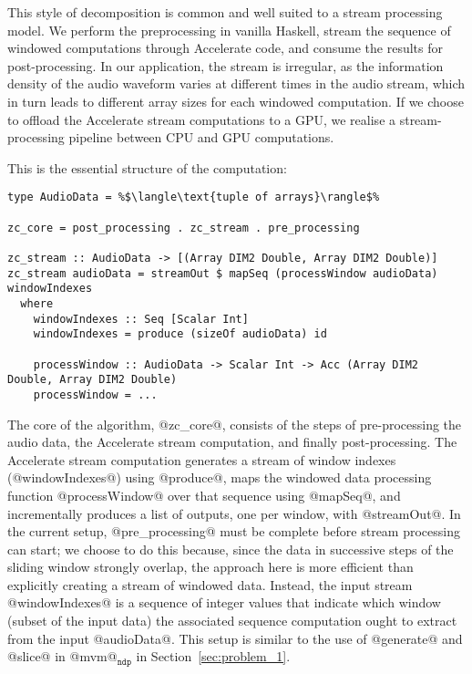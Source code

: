 
This style of decomposition is common and well suited to a stream processing model. We perform the preprocessing in vanilla Haskell, stream the sequence of windowed computations through Accelerate code, and consume the results for post-processing. In our application, the stream is irregular, as the information density of the audio waveform varies at different times in the audio stream, which in turn leads to different array sizes for each windowed computation. If we choose to offload the Accelerate stream computations to a GPU, we realise a stream-processing pipeline between CPU and GPU computations.

This is the essential structure of the computation:
%
\begin{lstlisting}
type AudioData = %$\langle\text{tuple of arrays}\rangle$%

zc_core = post_processing . zc_stream . pre_processing

zc_stream :: AudioData -> [(Array DIM2 Double, Array DIM2 Double)]
zc_stream audioData = streamOut $ mapSeq (processWindow audioData) windowIndexes
  where
    windowIndexes :: Seq [Scalar Int]
    windowIndexes = produce (sizeOf audioData) id

    processWindow :: AudioData -> Scalar Int -> Acc (Array DIM2 Double, Array DIM2 Double)
    processWindow = ...
\end{lstlisting}
%
The core of the algorithm, @zc_core@, consists of the steps of pre-processing the audio data, the Accelerate stream computation, and finally post-processing. The Accelerate stream computation generates a stream of window indexes (@windowIndexes@) using @produce@, maps the windowed data processing function @processWindow@ over that sequence using @mapSeq@, and incrementally produces a list of outputs, one per window, with @streamOut@. In the current setup, @pre_processing@ must be complete before stream processing can start; we choose to do this because, since the data in successive steps of the sliding window strongly overlap, the approach here is more efficient than explicitly creating a stream of windowed data. Instead, the input stream @windowIndexes@ is a sequence of integer values that indicate which window (subset of the input data) the associated sequence computation ought to extract from the input @audioData@. This setup is similar to the use of @generate@ and @slice@ in @mvm@$_{\texttt{ndp}}$ in Section~\ref{sec:problem_1}.

